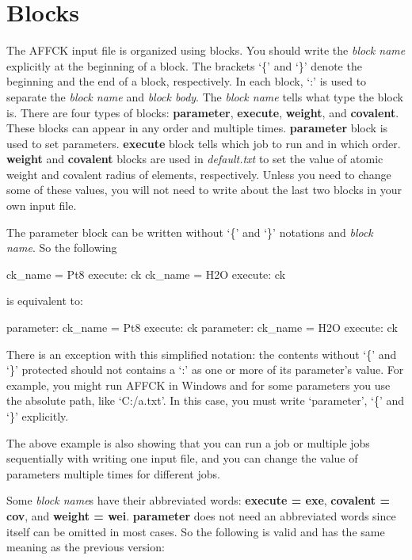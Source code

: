 \documentclass[11pt]{book}
\begin{document}
\section{Blocks}

The AFFCK input file is organized using blocks. You should write the \emph{block name} explicitly at the beginning 
of a block. The brackets `\{' and `\}' denote the beginning and the end of a block, respectively.
In each block, `:' is used to separate the \emph{block name} and \emph{block body}. The \emph{block name} 
tells what type the block is. There are four types of blocks: \textbf{parameter}, \textbf{execute}, \textbf{weight}, and \textbf{covalent}. 
These blocks can appear in any order and multiple times. \textbf{parameter} block is used to set parameters. 
\textbf{execute} block tells which job to run and in which order. \textbf{weight} and \textbf{covalent} blocks 
are used in \emph{default.txt} to set the value of atomic weight and covalent radius of elements, respectively. 
Unless you need to change some of these values, you will not need to write about the last two blocks in your own input file.

The parameter block can be written without `\{' and `\}' notations and \emph{block name}. So the following

\begin{everbatim}
ck_name = Pt8
{ execute: ck }
ck_name = H2O
{ execute: ck }
\end{everbatim}

is equivalent to:

\begin{everbatim}
{ parameter: ck_name = Pt8 }
{ execute: ck }
{ parameter: ck_name = H2O }
{ execute: ck }
\end{everbatim}

There is an exception with this simplified notation: the contents without `\{' and `\}' protected should not 
contains a `:' as one or more of its parameter's value. For example, you might run AFFCK in Windows and for 
some parameters you use the absolute path, like `C:/a.txt'. In this case, you must write `parameter',
`\{' and `\}' explicitly.

The above example is also showing that you can run a job or multiple jobs sequentially with writing one 
input file, and you can change the value of parameters multiple times for different jobs.

Some \emph{block name}s have their abbreviated words: \textbf{execute = exe}, \textbf{covalent = cov}, and 
\textbf{weight = wei}. \textbf{parameter} does not need an abbreviated words since itself can be omitted
in most cases. So the following is valid and has the same meaning as the previous version:
\end{document}
